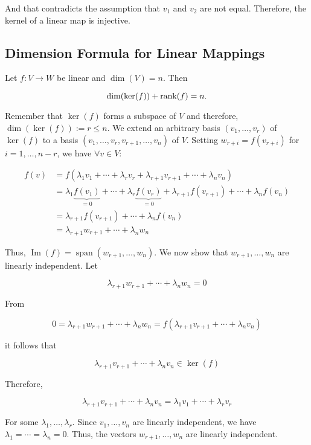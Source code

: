 And that contradicts the assumption that \(v_1\) and \(v_2\) are not equal. Therefore, the 
kernel of a linear map is injective.

\subsection{Dimension Formula for Linear Mappings}

Let \(f: V \to W\) be linear and \(\dim(V) = n\). Then
    
\[
    \dim(\ker(f)) + \text{rank}(f) = n.
\]
    
Remember that \(\ker(f)\) forms a subspace of \(V\) and therefore, \(\dim(\ker(f)) := r \leq n\). We extend an arbitrary basis \((v_1, \ldots, v_r)\) of \(\ker(f)\) to a basis \((v_1, \ldots, v_r, v_{r+1}, \ldots, v_n)\) of \(V\). Setting \(w_{r+i} = f(v_{r+i})\) for \(i = 1, \ldots, n - r\), we have \(\forall v \in V\):

\begin{align*}
    f(v) &= f(\lambda_1v_1 + \cdots + \lambda_r v_r + \lambda_{r+1}v_{r+1} + \cdots + \lambda_n v_n) \\
    &= \lambda_1 \underbrace{f(v_1)}_{=0} + \cdots + \lambda_r \underbrace{f(v_r)}_{=0} + \lambda_{r+1} f(v_{r+1}) + \cdots + \lambda_n f(v_n) \\
    &= \lambda_{r+1} f(v_{r+1}) + \cdots + \lambda_n f(v_n) \\
    &= \lambda_{r+1}w_{r+1} + \cdots + \lambda_n w_n
\end{align*}
    
Thus, \(\operatorname{Im}(f) = \operatorname{span}(w_{r+1}, \ldots, w_n)\). We now show that \(w_{r+1}, \ldots, w_n\) are linearly independent. Let 
    
\[
    \lambda_{r+1}w_{r+1} + \cdots + \lambda_n w_n = 0
\]
    
From

\[
    0 = \lambda_{r+1}w_{r+1} + \cdots + \lambda_n w_n = f(\lambda_{r+1}v_{r+1} + \cdots + \lambda_n v_n)
\]
    
it follows that

\[
    \lambda_{r+1}v_{r+1} + \cdots + \lambda_n v_n \in \ker(f)
\]
    
Therefore,
    
\[
    \lambda_{r+1}v_{r+1} + \cdots + \lambda_n v_n = \lambda_1v_1 + \cdots + \lambda_r v_r
\]

For some \(\lambda_1, \ldots, \lambda_r\). Since \(v_1, \ldots, v_n\) are linearly independent, 
we have \(\lambda_1 = \cdots = \lambda_n = 0\). Thus, the vectors \(w_{r+1}, \ldots, w_n\) are linearly 
independent.
    
